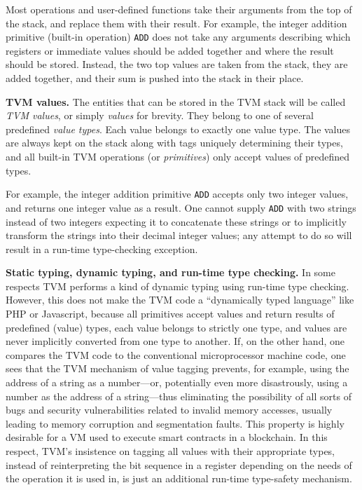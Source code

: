 \documentclass[12pt,oneside]{article}
\def\makepoint#1{\medbreak\noindent{\bf #1.\ }}
\def\nxsubpoint{\refstepcounter{subsubsection}%
    \smallbreak\makepoint{\thesubsubsection}}
\def\emb#1{\textbf{#1.}}
\begin{document}
    Most operations and user-defined functions take their arguments from
    the top of the stack, and replace them with their result. For example, the integer addition primitive (built-in operation) \texttt{ADD} does not take any arguments describing which registers or immediate values should be added together and where the result should be stored. Instead, the two top values are taken from the stack, they are added together, and their sum is pushed into the stack in their place.

    \nxsubpoint\label{sp:tvm.val}\emb{TVM values}
    The entities that can be stored in the TVM stack will be called {\em TVM values}, or simply {\em values\/} for brevity. They belong to one of several predefined {\em value types}. Each value belongs to exactly one value type. The values are always kept on the stack along with tags uniquely determining their types, and all built-in TVM operations (or {\em primitives}) only accept values of predefined types.

    For example, the integer addition primitive \texttt{ADD} accepts only two integer values, and returns one integer value as a result. One cannot supply \texttt{ADD} with two strings instead of two integers expecting it to concatenate these strings or to implicitly transform the strings into their decimal integer values; any attempt to do so will result in a run-time type-checking exception.

    \nxsubpoint\emb{Static typing, dynamic typing, and run-time type checking}
    In some respects TVM performs a kind of dynamic typing using run-time type checking. However, this does not make the TVM code a ``dynamically typed language'' like PHP or Javascript, because all primitives accept values and return results of predefined (value) types, each value belongs to strictly one type, and values are never implicitly converted from one type to another. If, on the other hand, one compares the TVM code to the conventional microprocessor machine code, one sees that the TVM mechanism of value tagging prevents, for example, using the address of a string as a number---or, potentially even more disastrously, using a number as the address of a string---thus eliminating the possibility of all sorts of bugs and security vulnerabilities related to invalid memory accesses, usually leading to memory corruption and segmentation faults. This property is highly desirable for a VM used to execute smart contracts in a blockchain. In this respect, TVM's insistence on tagging all values with their appropriate types, instead of reinterpreting the bit sequence in a register depending on the needs of the operation it is used in, is just an additional run-time type-safety mechanism.
\end{document}
